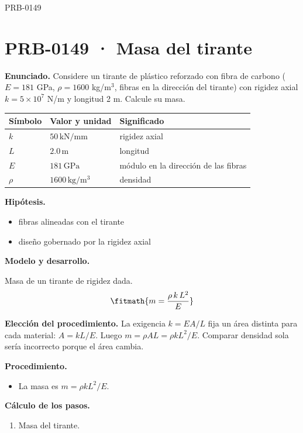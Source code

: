 \begin{studiumworked}{PRB-0149}

\section{PRB-0149 · Masa del tirante}

\textbf{Enunciado.} Considere un tirante de plástico reforzado con fibra de carbono ($E = 181$ GPa, $\rho = 1600$ kg/m$^3$, fibras en la dirección del tirante) con rigidez axial $k = 5\times 10^{7}$ N/m y longitud 2 m. Calcule su masa.

\par\medskip\noindent\begin{tabular}{@{}p{.18\linewidth}p{.26\linewidth}p{.48\linewidth}@{}}
\toprule Símbolo & Valor y unidad & Significado\\\midrule
$k$ & $50\,\mathrm{kN/mm}$ & rigidez axial\\
$L$ & $2.0\,\mathrm{m}$ & longitud\\
$E$ & $181\,\mathrm{GPa}$ & módulo en la dirección de las fibras\\
$\rho$ & $1600\,\mathrm{kg/m^3}$ & densidad\\
\bottomrule\end{tabular}\par\medskip

\textbf{Hipótesis.}\begin{itemize}\item fibras alineadas con el tirante
\item diseño gobernado por la rigidez axial\end{itemize}

\textbf{Modelo y desarrollo.}

Masa de un tirante de rigidez dada.\[\fitmath{m = \frac{\rho\,k\,L^{2}}{E}}\]

\textbf{Elección del procedimiento.} La exigencia $k=EA/L$ fija un área distinta para cada material: $A=kL/E$. Luego $m=\rho AL=\rho kL^2/E$. Comparar densidad sola sería incorrecto porque el área cambia.

\textbf{Procedimiento.}\begin{itemize}\item La masa es $m = \rho k L^2/E$.\end{itemize}

\textbf{Cálculo de los pasos.}

\begin{enumerate}

\item Masa del tirante.


\end{enumerate}
\end{studiumworked}
